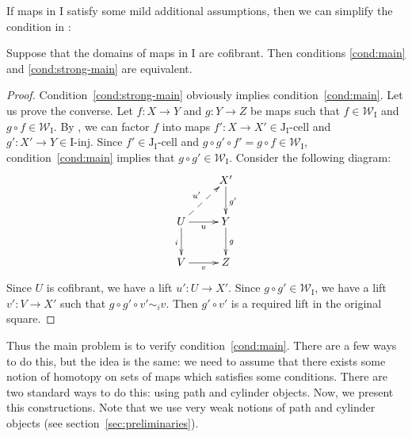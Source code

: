 \documentclass{tac}
\theoremstyle{definition}
\newcommand{\we}{\mathcal{W}}
\newcommand{\I}{\mathrm{I}}
\newcommand{\J}{\mathrm{J}}
\newcommand{\class}[2]{#1\text{-}\mathrm{#2}}
\newcommand{\Iinj}[1][\I]{\class{#1}{inj}}
\newcommand{\Icell}[1][\I]{\class{#1}{cell}}
\newcommand{\Jcell}[1][]{\Icell[\J#1]}
\begin{document}
If maps in $\I$ satisfy some mild additional assumptions, then we can simplify the condition in :
\begin{prop}[main]
Suppose that the domains of maps in $\I$ are cofibrant.
Then conditions \eqref{cond:main} and \eqref{cond:strong-main} are equivalent.
\end{prop}
\begin{proof}
Condition~\eqref{cond:strong-main} obviously implies condition~\eqref{cond:main}.
Let us prove the converse.
Let $f : X \to Y$ and $g : Y \to Z$ be maps such that $f \in \we_\I$ and $g \circ f \in \we_\I$.
By , we can factor $f$ into maps $f' : X \to X' \in \Jcell[_\I]$ and $g' : X' \to Y \in \Iinj$.
Since $f' \in \Jcell[_\I]$ and $g \circ g' \circ f' = g \circ f \in \we_\I$, condition~\eqref{cond:main} implies that $g \circ g' \in \we_\I$.
Consider the following diagram:
\[ \xymatrix{ & X' \ar[d]^{g'} \\
              U \ar[r]_u \ar[d]_i \ar@{-->}[ur]^{u'} & Y \ar[d]^g \\
              V \ar[r]_v & Z
            } \]
Since $U$ is cofibrant, we have a lift $u' : U \to X'$.
Since $g \circ g' \in \we_\I$, we have a lift $v' : V \to X'$ such that $g \circ g' \circ v' \sim_i v$.
Then $g' \circ v'$ is a required lift in the original square.
\end{proof}

Thus the main problem is to verify condition~\eqref{cond:main}.
There are a few ways to do this, but the idea is the same:
we need to assume that there exists some notion of homotopy on sets of maps which satisfies some conditions.
There are two standard ways to do this: using path and cylinder objects.
Now, we present this constructions.
Note that we use very weak notions of path and cylinder objects (see section~\ref{sec:preliminaries}).
\end{document}
